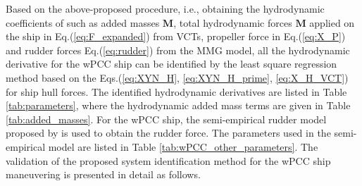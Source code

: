 \noindent Based on the above-proposed procedure, i.e., obtaining the hydrodynamic coefficients of such as added masses $\boldsymbol{M}$, total hydrodynamic forces $\boldsymbol{M}$ applied on the ship in Eq.(\ref{eq:F_expanded}) from VCTs, propeller force in Eq.(\ref{eq:X_P}) and rudder forces Eq.(\ref{eq:rudder}) from the MMG model, all the hydrodynamic derivative for the wPCC ship can be identified by the least square regression method based on the Eqs.(\ref{eq:XYN_H}, \ref{eq:XYN_H_prime}, \ref{eq:X_H_VCT}) for ship hull forces. The identified hydrodynamic derivatives are listed in Table \ref{tab:parameters}, where the hydrodynamic added mass terms are given in Table \ref{tab:added_masses}. For the wPCC ship, the semi-empirical rudder model proposed by \cite{alexanderssonSystemIdentificationPhysicsinformed2024b} is used to obtain the rudder force. The parameters used in the semi-empirical model are listed in Table \ref{tab:wPCC_other_parameters}. The validation of the proposed system identification method for the wPCC ship maneuvering is presented in detail as follows.
